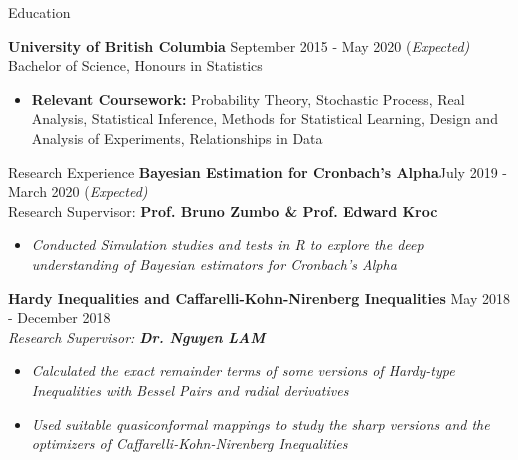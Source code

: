 \documentclass{resume}
\begin{document}
\begin{rSection}{Education}

{\bf University of British Columbia} \hfill { September 2015 - May 2020 (\em Expected)} 
\\ Bachelor of Science, Honours in Statistics \hfill 
\begin{itemize}
\item {\bf Relevant Coursework:}
Probability Theory, Stochastic Process, Real Analysis, Statistical Inference, Methods for Statistical Learning, Design and Analysis of Experiments, Relationships in Data
\end{itemize}
\end{rSection}


\begin{rSection}{Research  Experience}
{\bf Bayesian Estimation for Cronbach's Alpha}\hfill{July 2019 - March 2020 (\em Expected)}\\{ Research Supervisor: \bf Prof. Bruno Zumbo \& Prof. Edward Kroc}
\begin{itemize}\item
\em Conducted Simulation studies and tests in R to explore the deep understanding of Bayesian estimators for Cronbach's Alpha\end{itemize}
{\bf Hardy Inequalities and Caffarelli-Kohn-Nirenberg Inequalities }\hfill{May 2018 - December 2018}\\{\em Research Supervisor: \bf Dr. Nguyen LAM}\begin{itemize}\item
\em   Calculated the exact remainder terms of some versions of Hardy-type Inequalities with Bessel Pairs and radial derivatives\item
\em Used suitable quasiconformal mappings to study the sharp versions and the optimizers of Caffarelli-Kohn-Nirenberg Inequalities \end{itemize}




\end{rSection}
\end{document}
